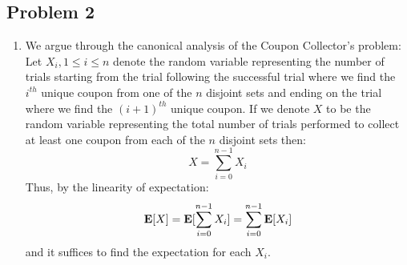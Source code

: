 \documentclass[12pt]{article}%
\begin{document}
\subsection*{Problem 2}
\begin{enumerate}
  \item We argue through the canonical analysis of the Coupon Collector's problem:
  Let $X_i,1 \leq i \leq n$ denote the random variable representing the number of trials starting from the trial following the successful trial where we find the $i^{th}$ unique coupon from one of the $n$ disjoint sets and ending on the trial where we find the $(i+1)^{th}$ unique coupon. If we denote $X$ to be the random variable representing the total number of trials performed to collect at least one coupon from each of the $n$ disjoint sets then:
  $$ X = \sum_{i=0}^{n-1} X_i$$
  Thus, by the linearity of expectation:
  $${\bf E}[X] = {\bf E}[\sum_{i=0}^{n-1} X_i] = \sum_{i=0}^{n-1} {\bf E}[X_i]$$
  and it suffices to find the expectation for each $X_i$.


\end{enumerate}
\end{document}
